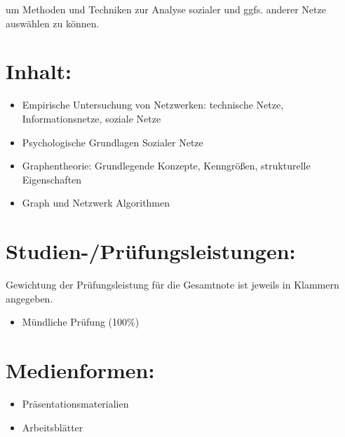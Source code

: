 um Methoden und Techniken zur Analyse sozialer und ggfs. anderer Netze
auswählen zu können.

\section*{Inhalt:\label{/mi-2017/modulbeschreibungen-master/MA_SC_Modul_Netzwerk--und-Graphentheorie}}\label{inhaltpathlabelmi-2017modulbeschreibungen-mastermaux5fscux5fmodulux5fnetzwerkund-graphentheorie}

\begin{itemize}
\tightlist
\item
  Empirische Untersuchung von Netzwerken: technische Netze,
  Informationsnetze, soziale Netze
\item
  Psychologische Grundlagen Sozialer Netze
\item
  Graphentheorie: Grundlegende Konzepte, Kenngrößen, strukturelle
  Eigenschaften
\item
  Graph und Netzwerk Algorithmen
\end{itemize}

\section*{Studien-/Prüfungsleistungen:\label{/mi-2017/modulbeschreibungen-master/MA_SC_Modul_Netzwerk--und-Graphentheorie}}\label{studien-pruxfcfungsleistungenpathlabelmi-2017modulbeschreibungen-mastermaux5fscux5fmodulux5fnetzwerkund-graphentheorie}

Gewichtung der Prüfungsleistung für die Gesamtnote ist jeweils in
Klammern angegeben.

\begin{itemize}
\tightlist
\item
  Mündliche Prüfung (100\%)
\end{itemize}

\section*{Medienformen:\label{/mi-2017/modulbeschreibungen-master/MA_SC_Modul_Netzwerk--und-Graphentheorie}}\label{medienformenpathlabelmi-2017modulbeschreibungen-mastermaux5fscux5fmodulux5fnetzwerkund-graphentheorie}

\begin{itemize}
\tightlist
\item
  Präsentationsmaterialien
\item
  Arbeitsblätter
\end{itemize}

